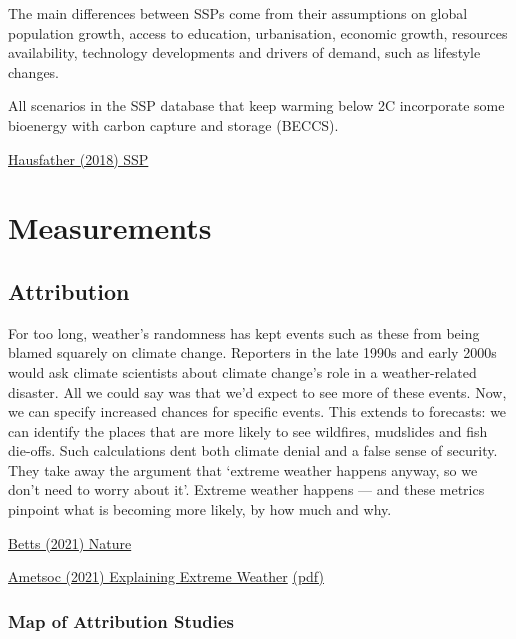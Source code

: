 \documentclass[
]{book}
\begin{document}
The main differences between SSPs come from their assumptions on global population growth, access to education, urbanisation, economic growth, resources availability, technology developments and drivers of demand, such as lifestyle changes.

All scenarios in the SSP database that keep warming below 2C incorporate some bioenergy with carbon capture and storage (BECCS).

\href{https://www.carbonbrief.org/explainer-how-shared-socioeconomic-pathways-explore-future-climate-change}{Hausfather (2018) SSP}

\hypertarget{part-measurements}{%
\part{Measurements}\label{part-measurements}}

\hypertarget{attribution}{%
\chapter{Attribution}\label{attribution}}

For too long, weather's randomness has kept events such as these from being blamed squarely on climate change. Reporters in the late 1990s and early 2000s would ask climate scientists about climate change's role in a weather-related disaster. All we could say was that we'd expect to see more of these events. Now, we can specify increased chances for specific events. This extends to forecasts: we can identify the places that are more likely to see wildfires, mudslides and fish die-offs. Such calculations dent both climate denial and a false sense of security. They take away the argument that `extreme weather happens anyway, so we don't need to worry about it'. Extreme weather happens --- and these metrics pinpoint what is becoming more likely, by how much and why.

\href{https://www.nature.com/articles/d41586-021-00185-x}{Betts (2021) Nature}

\href{https://www.ametsoc.org/ams/index.cfm/publications/bulletin-of-the-american-meteorological-society-bams/explaining-extreme-events-from-a-climate-perspective/}{Ametsoc (2021) Explaining Extreme Weather}
\href{pdf/Ametsoc_2021_Explaining_Extreme_2019.pdf}{(pdf)}

\hypertarget{map-of-attribution-studies}{%
\section{Map of Attribution Studies}\label{map-of-attribution-studies}}
\end{document}
